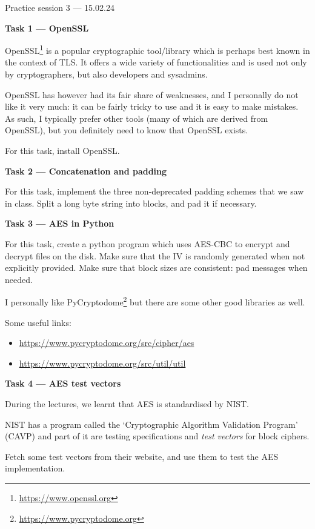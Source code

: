 \documentclass{practice}
\begin{document}
\begin{center}
Practice session 3 --- 15.02.24
\end{center}

\textbf{Task 1 --- OpenSSL}

OpenSSL\footnote{\url{https://www.openssl.org}} is a popular cryptographic tool/library which is perhaps best known in the context of TLS.
It offers a wide variety of functionalities and is used not only by cryptographers, but also developers and sysadmins.

OpenSSL has however had its fair share of weaknesses, and I personally do not like it very much: it can be fairly tricky to use and it is easy to make mistakes.
As such, I typically prefer other tools (many of which are derived from OpenSSL), but you definitely need to know that OpenSSL exists.

For this task, install OpenSSL.

\textbf{Task 2 --- Concatenation and padding}

For this task, implement the three non-deprecated padding schemes that we saw in class.
Split a long byte string into blocks, and pad it if necessary.

\textbf{Task 3 --- AES in Python}

For this task, create a python program which uses AES-CBC to encrypt and decrypt files on the disk. Make sure that the IV is randomly generated when not explicitly provided.
Make sure that block sizes are consistent: pad messages when needed.

I personally like PyCryptodome\footnote{\url{https://www.pycryptodome.org}} but there are some other good libraries as well.

Some useful links:
\begin{itemize}
  \item \url{https://www.pycryptodome.org/src/cipher/aes}
  \item \url{https://www.pycryptodome.org/src/util/util}
\end{itemize}

\textbf{Task 4 --- AES test vectors}

During the lectures, we learnt that AES is standardised by NIST.

NIST has a program called the `Cryptographic Algorithm Validation Program' (CAVP) and part of it are testing specifications and \emph{test vectors} for block ciphers.

Fetch some test vectors from their website, and use them to test the AES implementation.
\end{document}
